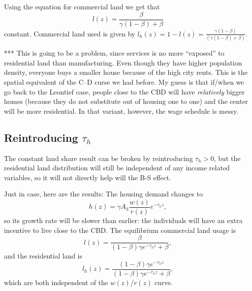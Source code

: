 \documentclass[10pt]{article}
\begin{document}
Using the equation for commercial land we get that
\begin{equation}
l(z)=\frac{\beta}{\gamma(1-\beta)+\beta}
\end{equation}
constant. Commercial land used is given by $l_h(z)=1-l(z)=\frac{\gamma(1-\beta)}{(\gamma(1-\beta)+\beta)}$.

*** This is going to be a problem, since services is no more ``exposed'' to residential land than manufacturing. Even though they have higher population density, everyone buys a smaller house because of the high city rents. This is the spatial equivalent of the C--D curse we had before. My guess is that if/when we go back to the Leontief case, people close to the CBD will have \emph{relatively} bigger homes (because they do not substitute out of housing one to one) and the center will be more residential. In that variant, however, the wage schedule is messy.

\subsection{Reintroducing $\tau_h$}
The constant land share result can be broken by reintroducing $\tau_h>0$, but the residential land distribution will still be independent of any income related variables, so it will not directly help will the B-S effect.

Just in case, here are the results:
The housing demand changes to 
\begin{equation*}
h(z)=\gamma A_h \frac{w(z)}{r(z)}e^{-\tau_hz},
\end{equation*}
so its growth rate will be slower than earlier: the individuals will have an extra incentive to live close to the CBD. The equilibrium commercial land usage is
\begin{equation*}
l(z)=\frac{\beta}{(1-\beta)\gamma e^{-\tau_hz}+\beta},
\end{equation*}
and the residential land is
\begin{equation*}
l_h(z)=\frac{(1-\beta)\gamma e^{-\tau_hz}}{(1-\beta)\gamma e^{-\tau_hz}+\beta},
\end{equation*}
which are both independent of the $w(z)/r(z)$ curve. 
\end{document}
